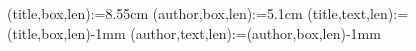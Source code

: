 




\makeatletter
\sffamily



\novaims(title,box,len):={8.55cm}
\novaims(author,box,len):={5.1cm}
\novaims(title,text,len):={\dimexpr \thenovaims(title,box,len)-1mm}
\novaims(author,text,len):={\dimexpr \thenovaims(author,box,len)-1mm}

\newlength{\novathesis@spinewidth}%
\setlength{\novathesis@spinewidth}{1mm * (\thelastsheet+ 19) / 20}%

\newlength{\novathesis@boxwidth}
\ifdim\novathesis@spinewidth > 6mm
  \setlength{\novathesis@boxwidth}{\novathesis@spinewidth-2mm}%
\else
  \setlength{\novathesis@boxwidth}{4mm}%
\fi
\newlength{\novathesis@spinetextwidth}
\setlength{\novathesis@spinetextwidth}{\novathesis@boxwidth-1mm}%


\newlength{\spine@len@top}
\setlength{\spine@len@top}{\thespine(top)}
\newlength{\spine@len@bottom}
\setlength{\spine@len@bottom}{\thespine(bottom)}
\newlength{\spine@len@name}
\newlength{\spine@len@title}
\newlength{\spine@len@year}
\newlength{\spine@len@all}
\setlength{\spine@len@all}{\spine@len@year+\spine@len@name+\spine@len@title
                           +\spine@len@top+\spine@len@bottom}
\newlength{\spine@len@gap}
\setlength{\spine@len@gap}{\stockheight-\spine@len@all}
  
